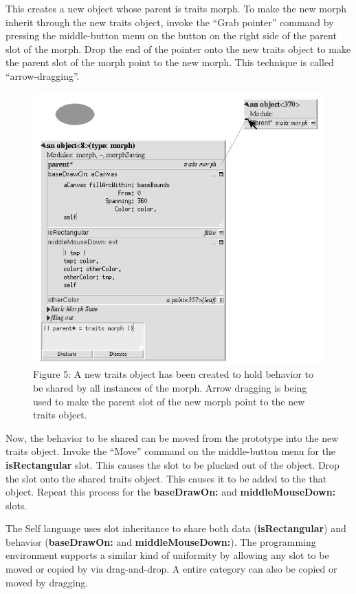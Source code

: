 \documentclass[letterpaper,10pt,english]{sphinxmanual}
\begin{document}
This creates a new object whose parent is traits morph. To make the new morph inherit through the new traits object, invoke the ``Grab pointer'' command by pressing the middle-button menu on the button on the right side of the parent slot of the morph. Drop the end of the pointer onto the new traits object to make the parent slot of the morph point to the new morph. This technique is called ``arrow-dragging''.
\begin{figure}[htbp]\begin{flushleft}
\capstart

\includegraphics{Figure5.png}
\caption{Figure 5: A new traits object has been created to hold behavior to be shared by all instances of the morph. Arrow dragging is being used to make the parent slot of the new morph point to the new traits object.}\end{flushleft}\end{figure}

Now, the behavior to be shared can be moved from the prototype into the new traits object. Invoke the ``Move'' command on the middle-button menu for the \textbf{isRectangular} slot. This causes the slot to be plucked out of the object. Drop the slot onto the shared traits object. This causes it to be added to the that object. Repeat this process for the \textbf{baseDrawOn:} and \textbf{middleMouseDown:} slots.

The Self language uses slot inheritance to share both data (\textbf{isRectangular}) and behavior (\textbf{baseDrawOn:} and \textbf{middleMouseDown:}). The programming environment supports a similar kind of uniformity by allowing any slot to be moved or copied by via drag-and-drop. A entire category can also be copied or moved by dragging.
\end{document}
